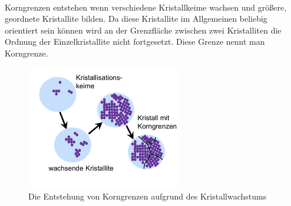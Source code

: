 \documentclass[11pt,a4paper]{article}
\numberwithin{equation}{section}
\numberwithin{figure}{section}
\begin{document}
\\
\begin{addmargin}[25pt]{0pt}
Korngrenzen entstehen wenn verschiedene Kristallkeime wachsen und größere, geordnete Kristallite bilden. Da diese Kristallite im Allgemeinen beliebig orientiert sein können wird an der Grenzfläche zwischen zwei Kristalliten die Ordnung der Einzelkristallite nicht fortgesetzt. Diese Grenze nennt man Korngrenze.
\begin{figure}[h]
    \centering
     \includegraphics[width = 0.6\textwidth]{images/Materialwissenschaften/Korngrenzen.jpeg}
    \caption{Die Entstehung von Korngrenzen aufgrund des Kristallwachstums}
    \label{fig:Korngrenzen}
\end{figure}
\end{addmargin}
\end{document}

